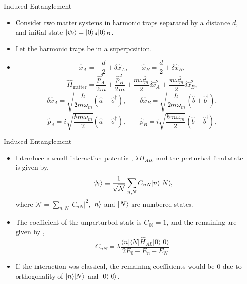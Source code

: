 \documentclass[12pt,aspectratio=1610]{beamer}
\renewcommand{\dag}{\dagger}
\DeclarePairedDelimiter\ket{\lvert}{\rangle}
\begin{document}
\begin{frame}{Induced Entanglement}
    \begin{itemize}
        \item Consider two matter systems in harmonic traps separated by a distance $d$, and initial state $\ket{\psi_i}=\ket{0}_A\ket{0}_B$.
        \item Let the harmonic traps be in a superposition.
        \item \begin{equation*}
    \hat{x}_{A}=-\frac{d}{2}+\delta\hat{x}_{A},\qquad \hat{x}_{B}=\frac{d}{2}+\delta\hat{x}_{B},
    \label{eq: Oscillator Locations}
\end{equation*}
\begin{equation*}
    \hat{H}_{\text{matter}} =  \frac{\hat{p}_A^2}{2m} + \frac{\hat{p}_B^2}{2m} + \frac{m\omega_m^2}{2}\delta\hat{x}^2_{A} + \frac{m\omega_m^2}{2}\delta\hat{x}^2_{B},
\end{equation*}
\begin{equation*} \label{eq: ModeOp1}
    \delta\hat{x}_{A} = \sqrt{\frac{\hbar}{2m\omega_m}}(\hat{a} + \hat{a}^{\dag}), \qquad \delta\hat{x}_{B} = \sqrt{\frac{\hbar}{2m\omega_m}}(\hat{b} + \hat{b}^{\dag}),
\end{equation*}
\begin{equation*} \label{eq: ModeOp2}
    \hat{p}_A = i\sqrt{\frac{\hbar m\omega_m}{2}}(\hat{a} - \hat{a}^{\dag}), \qquad \hat{p}_B = i\sqrt{\frac{\hbar m\omega_m}{2}}(\hat{b} - \hat{b}^{\dag}),
\end{equation*}
    \end{itemize}
\end{frame}
\begin{frame}{Induced Entanglement}
    \begin{itemize}
        \item Introduce a small interaction potential, $\lambda H_{AB}$, and the perturbed final state is given by, $$\ket{\psi_{\text{f}}}\equiv\frac{1}{\mathcal{\sqrt{N}}}\sum_{n,N}C_{nN}\ket{n}\ket{N},$$ where $\mathcal{N}=\sum_{n,N}\vert C_{nN}\vert^{2}$, $\ket{n}$ and $\ket{N}$ are numbered states.
        \item The coefficient of the unperturbed state is $C_{00} = 1$, and the remaining are given by \citep{Bose_2022}, $$C_{nN} =\lambda\frac{\langle n\vert\langle N\vert\hat{H}_{AB}\vert0\rangle\vert0\rangle}{2E_{0}-E_{n}-E_{N}}$$
        \item If the interaction was classical, the remaining coefficients would be $0$ due to orthogonality of $\ket{n}\ket{N}$ and $\ket{0}\ket{0}$.
    \end{itemize}
\end{frame}
\end{document}
